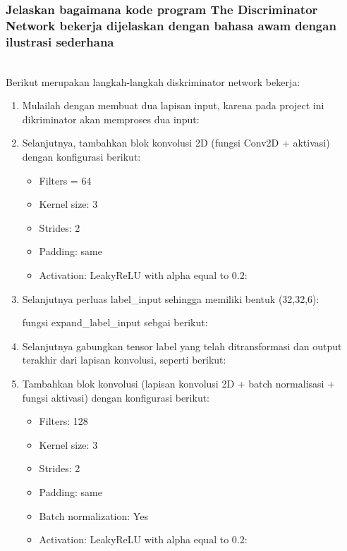\subsubsection{Jelaskan bagaimana kode program The Discriminator Network bekerja dijelaskan dengan bahasa awam dengan ilustrasi sederhana}
\hfill\\
Berikut merupakan langkah-langkah diskriminator network bekerja:
\begin{enumerate}
\item Mulailah dengan membuat dua lapisan input, karena pada project ini dikriminator akan memproses dua input:


\item Selanjutnya, tambahkan blok konvolusi 2D (fungsi Conv2D + aktivasi) dengan konfigurasi berikut:
	\begin{itemize}
		\item Filters = 64
		\item Kernel size: 3
		\item Strides: 2
		\item Padding: same
		\item Activation: LeakyReLU with alpha equal to 0.2:
	\end{itemize}


\item Selanjutnya perluas label\_input sehingga memiliki bentuk (32,32,6):

fungsi expand\_label\_input sebgai berikut:


\item Selanjutnya gabungkan tensor label yang telah ditransformasi dan output terakhir dari lapisan konvolusi, seperti berikut: 


\item Tambahkan blok konvolusi (lapisan konvolusi 2D + batch normalisasi + fungsi aktivasi) dengan konfigurasi berikut:
	\begin{itemize}
		\item Filters: 128
		\item Kernel size: 3
		\item Strides: 2
		\item Padding: same
		\item Batch normalization: Yes
		\item Activation: LeakyReLU with alpha equal to 0.2:
	\end{itemize}



\end{enumerate}
